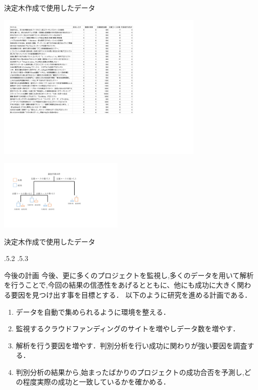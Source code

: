 \documentclass[uplatex]{jsarticle}
\makeatletter
\renewcommand{\section}{%
    \if@slide\clearpage\fi
    \@startsection{section}{1}{\z@}%
    {\Cvs \@plus.5\Cdp \@minus.2\Cdp}%
    {.5\Cvs \@plus.3\Cdp}%
    {\normalfont\raggedright}}
\makeatother
\begin{document}
\makeatletter
\def\setcaption#1{\def\@captype{#1}}
\makeatother

\begin{center}

\begin{minipage}{10cm}
  \setcaption{figure}
\caption{決定木作成で使用したデータ}
\includegraphics[width=10cm,clip]{figure2.pdf}
\end{minipage}
\begin{minipage}{6cm}
  \setcaption{table}
\includegraphics[width=6cm,clip]{figure.pdf}
 \caption{決定木作成で使用したデータ}
\end{minipage}
\end{center}


\section{今後の計画}
今後、更に多くのプロジェクトを監視し,多くのデータを用いて解析を行うことで,今回の結果の信憑性をあげるとともに、他にも成功に大きく関わる要因を見つけ出す事を目標とする．
以下のように研究を進める計画である．

\begin{enumerate}
\item データを自動で集められるように環境を整える．
\item 監視するクラウドファンディングのサイトを増やしデータ数を増やす．
\item 解析を行う要因を増やす．判別分析を行い成功に関わりが強い要因を調査する．
\item 判別分析の結果から,始まったばかりのプロジェクトの成功合否を予測し,どの程度実際の成功と一致しているかを確かめる．
\end{enumerate}



\end{document}
